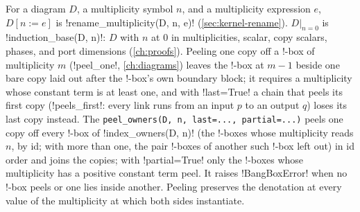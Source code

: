\begin{definition}\label{def:kernel-peel}
For a diagram $D$, a multiplicity symbol $n$, and a multiplicity expression $e$, $D[n:=e]$ is \py!rename_multiplicity(D, n, e)! (\cref{sec:kernel-rename}). $D|_{n=0}$ is \py!induction_base(D, n)!: $D$ with $n$ at $0$ in multiplicities, scalar, copy scalars, phases, and port dimensions (\cref{ch:proofs}). Peeling one copy off a !-box of multiplicity $m$ (\py!peel_one!, \cref{ch:diagrams}) leaves the !-box at $m-1$ beside one bare copy laid out after the !-box's own boundary block; it requires a multiplicity whose constant term is at least one, and with \py!last=True! a chain that peels its first copy (\py!peels_first!: every link runs from an input $p$ to an output $q$) loses its last copy instead. The  \texttt{peel\_\allowbreak{}owners(\allowbreak{}D,\allowbreak{} n,\allowbreak{} last=.\allowbreak{}.\allowbreak{}.\allowbreak{},\allowbreak{} partial=.\allowbreak{}.\allowbreak{}.\allowbreak{})} peels one copy off every !-box of \py!index_owners(D, n)! (the !-boxes whose multiplicity reads $n$, by id; with more than one, the pair !-boxes of another such !-box left out) in id order and joins the copies; with \py!partial=True! only the !-boxes whose multiplicity has a positive constant term peel. It raises \py!BangBoxError! when no !-box peels or one lies inside another. Peeling preserves the denotation at every value of the multiplicity at which both sides instantiate.
\end{definition}

